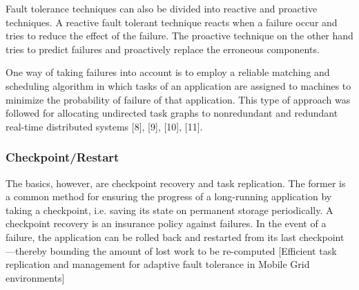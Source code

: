 \documentclass{cslthse-msc}
\begin{document}
Fault tolerance techniques can also be divided into reactive and proactive techniques. A reactive fault tolerant technique reacts when a failure occur and tries to reduce the effect of the failure. The proactive technique on the other hand tries to predict failures and proactively replace the erroneous components.

One way of taking failures into account is to employ a reliable matching and scheduling algorithm in which tasks of an application are assigned to machines to minimize the probability of failure of that application. This type of approach was followed for allocating undirected task graphs to nonredundant and redundant real-time distributed systems [8], [9], [10], [11].


\subsubsection{Checkpoint/Restart}

The basics, however, are checkpoint recovery and task replication. The former is a common method for ensuring the progress of a long-running application by taking a checkpoint, i.e. saving its state on permanent storage periodically. A checkpoint recovery is an insurance policy against failures. In the event of a failure, the application can be rolled back and restarted from its last checkpoint—thereby bounding the amount of lost work to be re-computed [Efficient task replication and management for adaptive fault tolerance in Mobile Grid environments]
\end{document}
